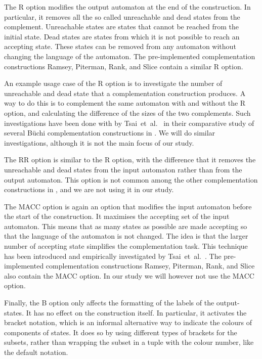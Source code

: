 The R option modifies the output automaton at the end of the construction. In particular, it removes all the so called unreachable and dead states from the complement. Unreachable states are states that cannot be reached from the initial state. Dead states are states from which it is not possible to reach an accepting state. These states can be removed from any automaton without changing the language of the automaton. The pre-implemented complementation constructions Ramsey, Piterman, Rank, and Slice contain a similar R option.

An example usage case of the R option is to investigate the number of unreachable and dead state that a complementation construction produces. A way to do this is to complement the same automaton with and without the R option, and calculating the difference of the sizes of the two complements. Such investigations have been done with by Tsai~et~al.~\cite{2011_tsai} in their comparative study of several Büchi complementation constructions in \goal. We will do similar investigations, although it is not the main focus of our study.

The RR option is similar to the R option, with the difference that it removes the unreachable and dead states from the input automaton rather than from the output automaton. This option is not common among the other complementation constructions in \goal, and we are not using it in our study.

The MACC option is again an option that modifies the input automaton before the start of the construction. It maximises the accepting set of the input automaton. This means that as many states as possible are made accepting so that the language of the automaton is not changed. The idea is that the larger number of accepting state simplifies the complementation task. This technique has been introduced and empirically investigated by Tsai~et~al.~\cite{2011_tsai}. The pre-implemented complementation constructions Ramsey, Piterman, Rank, and Slice also contain the MACC option. In our study we will however not use the MACC option.

Finally, the B option only affects the formatting of the labels of the output-states. It has no effect on the construction itself. In particular, it activates the bracket notation, which is an informal alternative way to indicate the colours of components of states. It does so by using different types of brackets for the subsets, rather than wrapping the subset in a tuple with the colour number, like the default notation.


